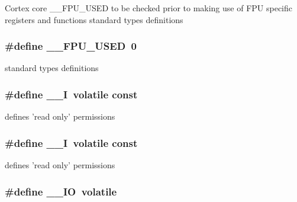 Cortex core \-\_\-\-\_\-\-F\-P\-U\-\_\-\-U\-S\-E\-D to be checked prior to making use of F\-P\-U specific registers and functions standard types definitions \hypertarget{group___c_m_s_i_s__core__definitions_gaa167d0f532a7c2b2e3a6395db2fa0776}{
\subsubsection[{\-\_\-\-\_\-\-F\-P\-U\-\_\-\-U\-S\-E\-D}]{\setlength{\rightskip}{0pt plus 5cm}\#define \-\_\-\-\_\-\-F\-P\-U\-\_\-\-U\-S\-E\-D~0}}\label{group___c_m_s_i_s__core__definitions_gaa167d0f532a7c2b2e3a6395db2fa0776}
standard types definitions \hypertarget{group___c_m_s_i_s__core__definitions_gaf63697ed9952cc71e1225efe205f6cd3}{
\subsubsection[{\-\_\-\-\_\-\-I}]{\setlength{\rightskip}{0pt plus 5cm}\#define \-\_\-\-\_\-\-I~volatile const}}\label{group___c_m_s_i_s__core__definitions_gaf63697ed9952cc71e1225efe205f6cd3}
defines 'read only' permissions \hypertarget{group___c_m_s_i_s__core__definitions_gaf63697ed9952cc71e1225efe205f6cd3}{
\subsubsection[{\-\_\-\-\_\-\-I}]{\setlength{\rightskip}{0pt plus 5cm}\#define \-\_\-\-\_\-\-I~volatile const}}\label{group___c_m_s_i_s__core__definitions_gaf63697ed9952cc71e1225efe205f6cd3}
defines 'read only' permissions \hypertarget{group___c_m_s_i_s__core__definitions_gaec43007d9998a0a0e01faede4133d6be}{
\subsubsection[{\-\_\-\-\_\-\-I\-O}]{\setlength{\rightskip}{0pt plus 5cm}\#define \-\_\-\-\_\-\-I\-O~volatile}}\label{group___c_m_s_i_s__core__definitions_gaec43007d9998a0a0e01faede4133d6be}
